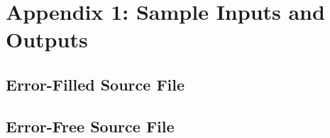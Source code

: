 \documentclass[titlepage]{article}
\newcommand{\ShowSampleFile}[2]
{
    
}
\newcommand{\ShowTokenFile}[2]
{
    
}
\begin{document}
    \clearpage{}
    \section*{Appendix 1: Sample Inputs and Outputs} %
    \subsection{Error-Filled Source File}
    \ShowSampleFile{appendix1/error_full/debug.pas}{Error-Full Source Code}
    \ShowSampleFile{appendix1/error_full/listing.txt}{Error-Full Listing File}
    \ShowTokenFile{appendix1/error_full/tokens.dat}{Error-Full Token File}

    \subsection{Error-Free Source File}
    \ShowSampleFile{appendix1/error_free/debug.pas}{Error-Free Source Code}
    \ShowSampleFile{appendix1/error_free/listing.txt}{Error-Free Listing File}
    \ShowTokenFile{appendix1/error_free/tokens.dat}{Error-Free Token File}

    \twocolumn{}
\end{document}

